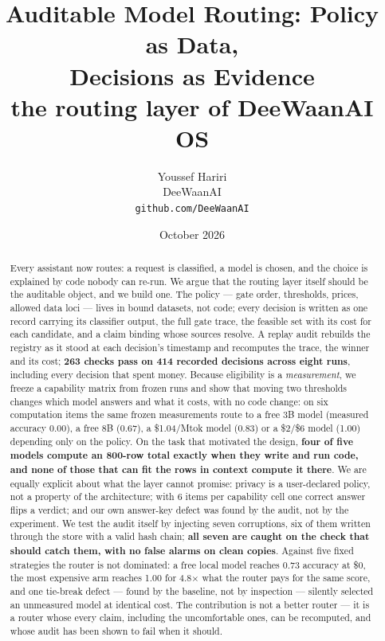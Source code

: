 \documentclass[11pt]{article}
\title{Auditable Model Routing: Policy as Data,\\Decisions as Evidence\\[4pt]
\large the routing layer of DeeWaanAI OS}
\author{Youssef Hariri\\DeeWaanAI\\\texttt{github.com/DeeWaanAI}}
\date{October 2026}
\begin{document}
\maketitle

\begin{abstract}
Every assistant now routes: a request is classified, a model is chosen, and the choice is
explained by code nobody can re-run. We argue that the routing layer itself should be the
auditable object, and we build one. The policy --- gate order, thresholds, prices, allowed
data loci --- lives in bound datasets, not code; every decision is written as one record
carrying its classifier output, the full gate trace, the feasible set with its cost for each
candidate, and a claim binding whose sources resolve. A replay audit rebuilds the registry as
it stood at each decision's timestamp and recomputes the trace, the winner and its cost;
\textbf{263 checks pass on 414 recorded decisions across eight runs}, including every
decision that spent money. Because
eligibility is a \emph{measurement}, we freeze a capability matrix from frozen runs and show
that moving two thresholds changes which model answers and what it costs, with no code change:
on six computation items the same frozen measurements route to a free 3B model (measured
accuracy 0.00), a free 8B (0.67), a \$1.04/Mtok model (0.83) or a \$2/\$6 model (1.00)
depending only on the policy. On the task that motivated the design, \textbf{four of five models
compute an 800-row total exactly when they write and run code, and none of those that can fit the
rows in context compute it there}. We are equally explicit about what the layer cannot promise: privacy is a
user-declared policy, not a property of the architecture; with 6 items per capability cell one
correct answer flips a verdict; and our own answer-key defect was found by the audit, not by the
experiment. We test the audit itself by injecting seven corruptions, six of them written through the
store with a valid hash chain; \textbf{all seven are caught on the check that should catch
them, with no false alarms on clean copies}. Against five fixed strategies the router is not
dominated: a free local model reaches 0.73 accuracy at \$0, the most expensive arm reaches 1.00
for 4.8$\times$ what the router pays for the same score, and one tie-break defect --- found by
the baseline, not by inspection --- silently selected an unmeasured model at identical cost.
The contribution is not a better router --- it is a router whose every claim, including the
uncomfortable ones, can be recomputed, and whose audit has been shown to fail when it should.
\end{abstract}
\end{document}
